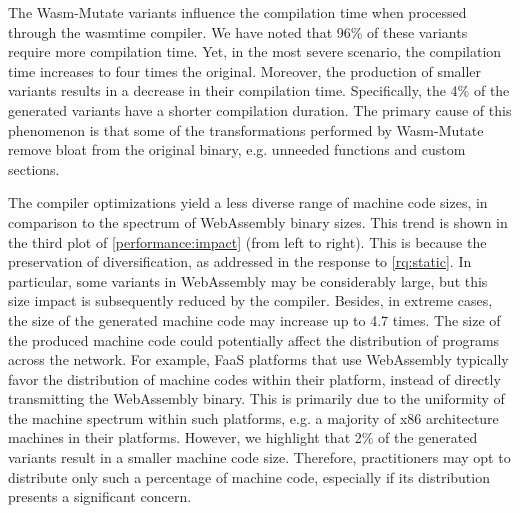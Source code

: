 \documentclass[a4paper,fleqn]{cas-dc}
\newcommand{\tool}{{\sc Wasm-Mutate}\xspace}
\newcommand{\Wasm}{WebAssembly\xspace}
\newenvironment{revision1}{\color{blue}}{}
\begin{document}
\begin{revision1}
The \tool variants influence the compilation time when processed through the wasmtime compiler. 
We have noted that 96\% of these variants require more compilation time. 
Yet, in the most severe scenario, the compilation time increases to four times the original. 
Moreover, the production of smaller variants results in a decrease in their compilation time. 
Specifically, the 4\% of the generated variants have a shorter compilation duration. 
The primary cause of this phenomenon is that some of the transformations performed by \tool remove bloat from the original binary, e.g. unneeded functions and custom sections.


The compiler optimizations yield a less diverse range of machine code sizes, in comparison to the spectrum of \Wasm binary sizes.
This trend is shown in the third plot of \autoref{performance:impact} (from left to right).
This is because the preservation of diversification, as addressed in the response to \autoref{rq:static}.
In particular, some variants in \Wasm may be considerably large, but this size impact is subsequently reduced by the compiler.
Besides, in extreme cases, the size of the generated machine code may increase up to 4.7 times.
The size of the produced machine code could potentially affect the distribution of programs across the network.
For example, FaaS platforms that use \Wasm typically favor the distribution of machine codes within their platform, instead of directly transmitting the \Wasm binary.
This is primarily due to the uniformity of the machine spectrum within such platforms, e.g. a majority of x86 architecture machines in their platforms.
However, we highlight that 2\% of the generated variants result in a smaller machine code size.
Therefore, practitioners may opt to distribute only such a percentage of machine code, especially if its distribution presents a significant concern.




\end{revision1}
\end{document}
